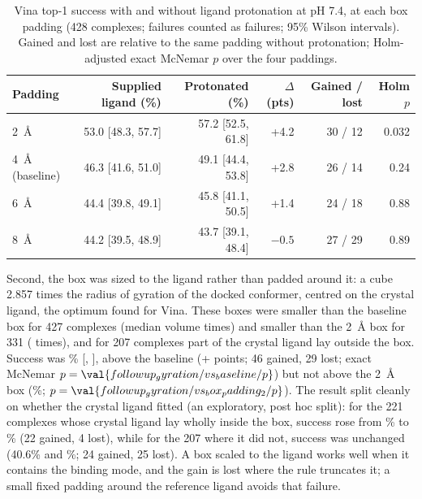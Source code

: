 \begin{table}[h]
  \centering
  \caption{Vina top-1 success with and without ligand protonation at pH 7.4, at each box
    padding (428 complexes; failures counted as failures; 95\% Wilson intervals). Gained
    and lost are relative to the same padding without protonation; Holm-adjusted exact
    McNemar $p$ over the four paddings.}
  \label{tab:interaction}
  \begin{tabular}{lrrrrr}
    \toprule
    Padding & Supplied ligand (\%) & Protonated (\%) & $\Delta$ (pts) & Gained / lost & Holm $p$ \\
    \midrule
    \SI{2}{\angstrom} & 53.0 [48.3, 57.7] & 57.2 [52.5, 61.8] & +4.2 & 30 / 12 & 0.032 \\
    \SI{4}{\angstrom} (baseline) & 46.3 [41.6, 51.0] & 49.1 [44.4, 53.8] & +2.8 & 26 / 14 & 0.24 \\
    \SI{6}{\angstrom} & 44.4 [39.8, 49.1] & 45.8 [41.1, 50.5] & +1.4 & 24 / 18 & 0.88 \\
    \SI{8}{\angstrom} & 44.2 [39.5, 48.9] & 43.7 [39.1, 48.4] & $-0.5$ & 27 / 29 & 0.89 \\
    \bottomrule
  \end{tabular}
\end{table}

Second, the box was sized to the ligand rather than padded around it: a cube 2.857 times
the radius of gyration of the docked conformer, centred on the crystal ligand, the
optimum \citet{feinstein2015boxsize} found for Vina. These boxes were smaller than the
baseline box for 427 complexes (median volume  times) and smaller than the
\SI{2}{\angstrom} box for 331 ( times), and for 207 complexes part of the crystal
ligand lay outside the box. Success was \% [, ], above the baseline (+
points; 46 gained, 29 lost; exact McNemar $p = \val{followup_gyration/vs_baseline/p}$) but not above the
\SI{2}{\angstrom} box (\%; $p = \val{followup_gyration/vs_box_padding_2/p}$). The result split cleanly on whether the
crystal ligand fitted (an exploratory, post hoc split): for the 221 complexes whose
crystal ligand lay wholly inside the box, success rose from \% to \% (22 gained,
4 lost), while for the 207 where it did not, success was unchanged (40.6\% and \%; 24
gained, 25 lost). A box scaled to the ligand works well when it contains the binding
mode, and the gain is lost where the rule truncates it; a small fixed padding around the
reference ligand avoids that failure.


